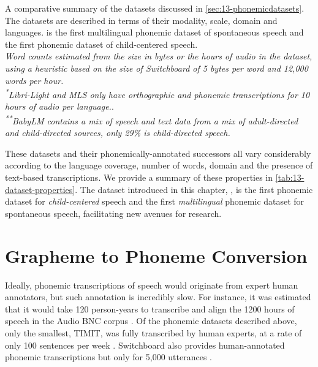 \begin{sidewaystable}
\begin{threeparttable}
        \caption{A comparative summary of the datasets discussed in \cref{sec:13-phonemicdatasets}. The datasets are described in terms of their modality, scale, domain and languages. \ipachildes is the first multilingual phonemic dataset of spontaneous speech and the first phonemic dataset of child-centered speech. \\\emph{\textdagger Word counts estimated from the size in bytes or the hours of audio in the dataset, using a heuristic based on the size of Switchboard of 5 bytes per word and 12,000 words per hour.}\\\emph{\textsuperscript{*}Libri-Light and MLS only have orthographic and phonemic transcriptions for 10 hours of audio per language.}.\\\emph{\textsuperscript{**}BabyLM contains a mix of speech and text data from a mix of adult-directed and child-directed sources, only 29\% is child-directed speech.}}
        \label{tab:13-dataset-properties}
    \end{threeparttable}
\end{sidewaystable}

%
These datasets and their phonemically-annotated successors all vary considerably according to the language coverage, number of words, domain and the presence of text-based transcriptions. We provide a summary of these properties in \cref{tab:13-dataset-properties}. The dataset introduced in this chapter, \ipachildes, is the first phonemic dataset for \emph{child-centered} speech and the first \emph{multilingual} phonemic dataset for spontaneous speech, facilitating new avenues for research. 

\section{Grapheme to Phoneme Conversion}\label{sec:13-g2p}

Ideally, phonemic transcriptions of speech would originate from expert human annotators, but such annotation is incredibly slow. For instance, it was estimated that it would take 120 person-years to transcribe and align the 1200 hours of speech in the Audio BNC corpus \citep{coleman2011mining}. Of the phonemic datasets described above, only the smallest, TIMIT, was fully transcribed by human experts, at a rate of only 100 sentences per week \citep{zue1996transcription, lamel1989speech}. Switchboard also provides human-annotated phonemic transcriptions but only for 5,000 utterances \citep{greenberg1996insights}.


